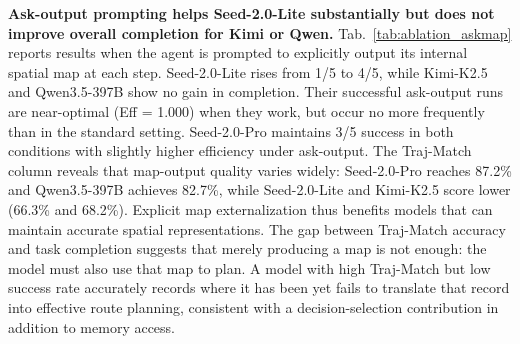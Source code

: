 \documentclass{llmxive}
\providecommand{\arraystretch}{1.05}
\begin{document}
\noindent\textbf{Ask-output prompting helps Seed-2.0-Lite substantially but does not improve overall completion for Kimi or Qwen.}\label{sec:appendix_askmap}
Tab.~\ref{tab:ablation_askmap} reports results when the agent is prompted to explicitly output its internal spatial map at each step. Seed-2.0-Lite rises from 1/5 to 4/5, while Kimi-K2.5 and Qwen3.5-397B show no gain in completion. Their successful ask-output runs are near-optimal (Eff = 1.000) when they work, but occur no more frequently than in the standard setting. Seed-2.0-Pro maintains 3/5 success in both conditions with slightly higher efficiency under ask-output. The Traj-Match column reveals that map-output quality varies widely: Seed-2.0-Pro reaches 87.2\% and Qwen3.5-397B achieves 82.7\%, while Seed-2.0-Lite and Kimi-K2.5 score lower (66.3\% and 68.2\%). Explicit map externalization thus benefits models that can maintain accurate spatial representations. The gap between Traj-Match accuracy and task completion suggests that merely producing a map is not enough: the model must also use that map to plan. A model with high Traj-Match but low success rate accurately records where it has been yet fails to translate that record into effective route planning, consistent with a decision-selection contribution in addition to memory access.
\renewcommand{\arraystretch}{1.1}
\end{document}
